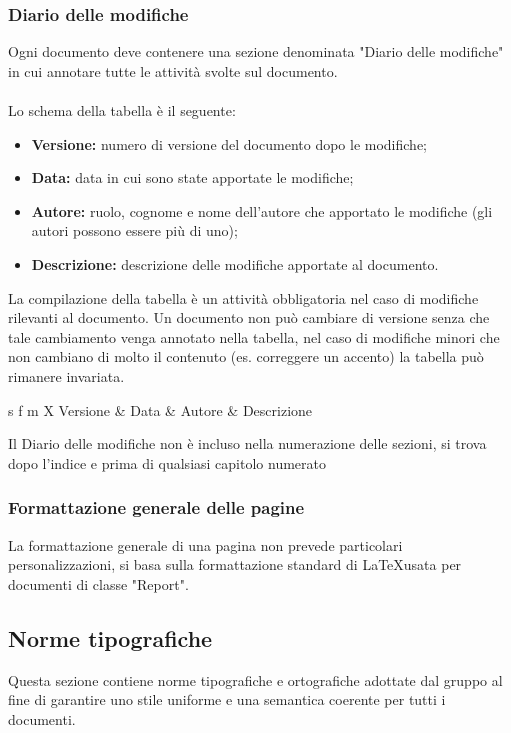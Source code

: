 \documentclass[a4paper]{report}
\begin{document}
	\subsubsection{Diario delle modifiche} 
		Ogni documento deve contenere una sezione denominata "Diario delle modifiche" in cui annotare tutte le 
		attività svolte sul documento.
		\\ \\
		Lo schema della tabella è il seguente:
		\begin{itemize}
			\item \textbf{Versione:} numero di versione del documento dopo le modifiche;
			\item \textbf{Data:} data in cui sono state apportate le modifiche;
			\item \textbf{Autore:} ruolo, cognome e nome dell'autore che apportato le modifiche (gli autori possono essere
			più di uno);
			\item \textbf{Descrizione:} descrizione delle modifiche apportate al documento.
		\end{itemize}
		La compilazione della tabella è un attività obbligatoria nel caso di modifiche rilevanti al documento. Un documento 
		non può cambiare di versione senza che tale cambiamento venga annotato nella tabella, nel caso di modifiche 
		minori che non cambiano di molto il contenuto (es. correggere un accento) la tabella può rimanere invariata.
		\begin{table}[H]
			\begin{tabularx}{\textwidth}{s f m X}
				 Versione & Data & Autore & Descrizione \\
			\end{tabularx}
			\caption{Schema del diario delle modifiche \label{tab:table_label}}
		\end{table} 
		Il Diario delle modifiche non è incluso nella numerazione delle sezioni, si trova dopo l'indice e prima di qualsiasi
		 capitolo numerato
	\subsubsection{Formattazione generale delle pagine}
	La formattazione generale di una pagina non prevede particolari personalizzazioni, si basa 
	sulla formattazione standard di \LaTeX \space usata per documenti di classe "Report". 
	\subsection{Norme tipografiche}
	Questa sezione contiene norme tipografiche e ortografiche adottate dal gruppo al fine di garantire uno stile
	uniforme e una semantica coerente per tutti i documenti.  
\end{document}
